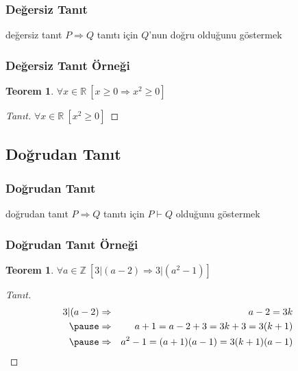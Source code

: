 \documentclass[dvipsnames]{beamer}
\theoremstyle{definition}
\theoremstyle{example}
\theoremstyle{plain}
\newtheorem{teorem}[theorem]{Teorem}
\begin{document}
\begin{frame}
  \frametitle{Değersiz Tanıt}

  \begin{block}{değersiz tanıt}
    $P \Rightarrow Q$ tanıtı için $Q$'nun doğru olduğunu göstermek
  \end{block}
\end{frame}

\begin{frame}
  \frametitle{Değersiz Tanıt Örneği}

  \begin{teorem}
    $\forall x \in \mathbb{R}~[x \geq 0 \Rightarrow x^2 \geq 0]$
  \end{teorem}

  \pause
  \begin{proof}[Tanıt]
    $\forall x \in \mathbb{R}~[x^2 \geq 0]$
  \end{proof}
\end{frame}

\subsection{Doğrudan Tanıt}

\begin{frame}
  \frametitle{Doğrudan Tanıt}

  \begin{block}{doğrudan tanıt}
    $P \Rightarrow Q$ tanıtı için $P \vdash Q$ olduğunu göstermek
  \end{block}
\end{frame}

\begin{frame}
  \frametitle{Doğrudan Tanıt Örneği}

  \begin{teorem}
    $\forall a \in \mathbb{Z}~[3 | (a-2) \Rightarrow 3 | (a^2-1)]$
  \end{teorem}

  \pause
  \begin{proof}[Tanıt]
    \begin{eqnarray*}
      3 | (a-2) & \Rightarrow & a-2 = 3k\\\pause
                & \Rightarrow & a+1 = a-2 + 3 = 3k+3 = 3(k+1)\\\pause
                & \Rightarrow & a^2-1 = (a+1)(a-1) = 3(k+1)(a-1)
    \end{eqnarray*}
  \end{proof}
\end{frame}
\end{document}
